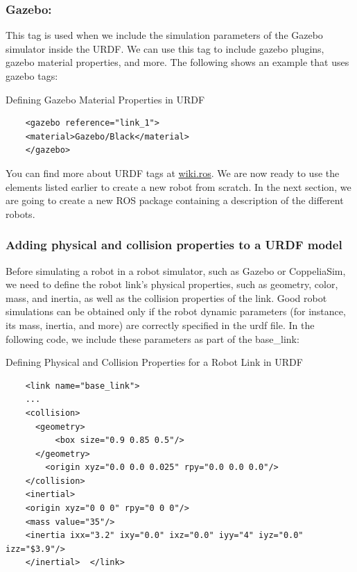 \documentclass[../../main]{subfiles}
\begin{document}
\subsubsection{Gazebo:}
This tag is used when we include the simulation parameters of the
Gazebo simulator inside the URDF. We can use this tag to include gazebo plugins,
gazebo material properties, and more. The following shows an example that uses
gazebo tags:

\begin{codebox}[]{Defining Gazebo Material Properties in URDF }
  \begin{verbatim}
    <gazebo reference="link_1">
    <material>Gazebo/Black</material>
    </gazebo>
\end{verbatim}
  \end{codebox}
You can find more about URDF tags at \href{http://wiki.ros.org/urdf/XML}{wiki.ros}\cite{ros_urdf_xml}. We are now
ready to use the elements listed earlier to create a new robot from scratch. In the next
section, we are going to create a new ROS package containing a description of the different
robots.

\subsubsection{Adding physical and collision properties to a URDF model}
Before simulating a robot in a robot simulator, such as Gazebo or CoppeliaSim, we need
to define the robot link's physical properties, such as geometry, color, mass, and inertia, as
well as the collision properties of the link.
Good robot simulations can be obtained only if the robot dynamic parameters (for
instance, its mass, inertia, and more) are correctly specified in the urdf file. In the
following code, we include these parameters as part of the base\_link:
\begin{codebox}[]{Defining Physical and Collision Properties for a Robot Link in URDF}
  
  \begin{verbatim}
    <link name="base_link">
    ...
    <collision>
      <geometry>
          <box size="0.9 0.85 0.5"/>
      </geometry>
        <origin xyz="0.0 0.0 0.025" rpy="0.0 0.0 0.0"/>
    </collision>
    <inertial>
    <origin xyz="0 0 0" rpy="0 0 0"/>
    <mass value="35"/>
    <inertia ixx="3.2" ixy="0.0" ixz="0.0" iyy="4" iyz="0.0" izz="$3.9"/>
    </inertial>  </link>
\end{verbatim}
  \end{codebox}
\end{document}

